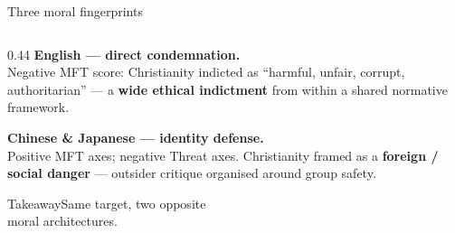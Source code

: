 \documentclass[aspectratio=169,10pt]{beamer}
\newcommand{\emphc}[1]{\textcolor{uzhaccent}{\textbf{#1}}}
\newcommand{\takeaway}[1]{%
  \vspace{0.3em}
  \begin{block}{Takeaway}#1\end{block}}
\begin{document}
\begin{frame}{Three moral fingerprints}
\begin{columns}[T,onlytextwidth]
    \begin{column}{0.44\textwidth}\small
      \vspace{0.6em}
      \textbf{\textcolor{enzh}{English} — direct condemnation.}\\
      \footnotesize
      Negative MFT score: Christianity indicted as
      ``harmful, unfair, corrupt, authoritarian'' —
      a \emphc{wide ethical indictment} from within a
      shared normative framework.
      \vspace{0.7em}

      \textbf{\textcolor{zhcol}{Chinese} \&
              \textcolor{jacol}{Japanese} — identity defense.}\\
      \footnotesize
      Positive MFT axes; negative Threat axes.
      Christianity framed as a \emphc{foreign / social danger}
      — outsider critique organised around group safety.
      \vspace{0.9em}

      \takeaway{Same target, two opposite\\
      moral architectures.}
    \end{column}

  \end{columns}
\end{frame}
\end{document}
